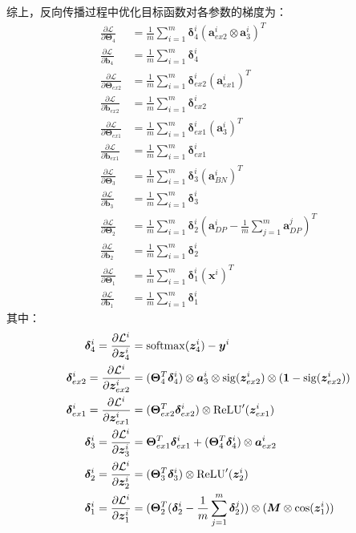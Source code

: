 \documentclass[12pt, a4paper]{article}
\newcommand{\imat}{\bm}
\newcommand{\ivec}{\bm}
\newcommand{\softmax}{{\rm softmax}}
\newcommand{\sigmoid}{{\rm sig}}
\newcommand{\relu}{{\rm ReLU}}
\newcommand{\loss}{\mathcal{L}}
\newcommand{\thetam}{\imat{\Theta}}
\newcommand{\deltav}{\ivec{\delta}}
\newcommand{\av}{\ivec{a}}
\newcommand{\bv}{\ivec{b}}
\newcommand{\xv}{\ivec{x}}
\newcommand{\yv}{\ivec{y}}
\newcommand{\zv}{\ivec{z}}
\begin{document}
        综上，反向传播过程中优化目标函数对各参数的梯度为：
        \begin{align*}
        \frac{\partial \loss}{\partial \thetam_4} &= \frac{1}{m} \sum_{i=1}^{m} \deltav_4^i (\av_{ex2}^i \otimes \av_3^i)^T \\
        \frac{\partial \loss}{\partial \bv_4} &= \frac{1}{m} \sum_{i=1}^{m} \deltav_4^i \\
        \frac{\partial \loss}{\partial \thetam_{ex2}} &= \frac{1}{m} \sum_{i=1}^{m} \deltav_{ex2}^i (\av_{ex1}^i)^T \\
        \frac{\partial \loss}{\partial \bv_{ex2}} &= \frac{1}{m} \sum_{i=1}^{m} \deltav_{ex2}^i \\
        \frac{\partial \loss}{\partial \thetam_{ex1}} &= \frac{1}{m} \sum_{i=1}^{m} \deltav_{ex1}^i (\av_3^i)^T \\
        \frac{\partial \loss}{\partial \bv_{ex1}} &= \frac{1}{m} \sum_{i=1}^{m} \deltav_{ex1}^i \\
        \frac{\partial \loss}{\partial \thetam_3} &= \frac{1}{m} \sum_{i=1}^{m} \deltav_3^i (\av_{BN}^i)^T \\
        \frac{\partial \loss}{\partial \bv_3} &= \frac{1}{m} \sum_{i=1}^{m} \deltav_3^i \\
        \frac{\partial \loss}{\partial \thetam_2} &= \frac{1}{m} \sum_{i = 1}^{m} \deltav_2^i (\av_{DP}^i - \frac{1}{m} \sum_{j=1}^{m} \av_{DP}^j)^T \\
        \frac{\partial \loss}{\partial \bv_2} &= \frac{1}{m} \sum_{i = 1}^{m} \deltav_2^i \\
        \frac{\partial \loss}{\partial \thetam_1} &= \frac{1}{m} \sum_{i=1}^{m} \deltav_1^i (\xv^i)^T \\
        \frac{\partial \loss}{\partial \bv_1} &= \frac{1}{m} \sum_{i=1}^{m} \deltav_1^i
        \end{align*}
        其中：
        \begin{align*}
        \deltav_4^i = \frac{\partial \loss^i}{\partial \zv_4^i} &= \softmax(\zv_4^i) - \yv^i \\
        \deltav_{ex2}^i = \frac{\partial \loss^i}{\partial \zv_{ex2}^i} &= (\thetam_4^T \deltav_4^i) \otimes \av_3^i \otimes \sigmoid(\zv_{ex2}^i) \otimes (\ivec{1} - \sigmoid(\zv_{ex2}^i)) \\
        \deltav_{ex1}^i = \frac{\partial \loss^i}{\partial \zv_{ex1}^i} &= (\thetam_{ex2}^T \deltav_{ex2}^i) \otimes \relu^{\prime}(\zv_{ex1}^i) \\
        \deltav_3^i = \frac{\partial \loss^i}{\partial \zv_3^i} &= \thetam_{ex1}^T \deltav_{ex1}^i + (\thetam_4^T \deltav_4^i) \otimes \av_{ex2}^i \\
        \deltav_2^i = \frac{\partial \loss^i}{\partial \zv_2^i} &= (\thetam_3^T \deltav_3^i) \otimes \relu^{\prime}(\zv_2^i) \\
        \deltav_1^i = \frac{\partial \loss^i}{\partial \zv_1^i} &= (\thetam_2^T (\deltav_2^i - \frac{1}{m} \sum_{j = 1}^{m} \deltav_2^j)) \otimes (\ivec{M} \otimes \cos(\zv_1^i))
        \end{align*}
\end{document}
